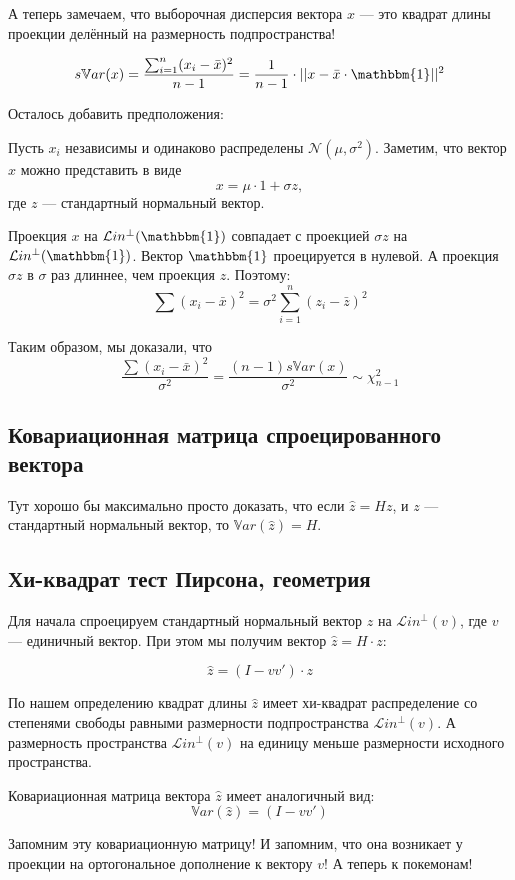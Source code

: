 \documentclass[11pt,russian,]{article}
\newcommand{\cN}{\mathcal{N}}
\newcommand{\1}{\mathbbm{1}}
\newcommand{\Lin}{\mathcal{L}in}
\newcommand{\Linp}{\Lin^{\perp}}
\newcommand{\sVar}{s\mathbb{V}ar}
\newcommand{\Var}{\mathbb{V}ar}
\begin{document}
А теперь замечаем, что выборочная дисперсия вектора \(x\) --- это
квадрат длины проекции делённый на размерность подпространства!

\[
\sVar(x) = \frac{\sum_{i=1}^n (x_i - \bar x)^2}{n-1} = \frac{1}{n-1}\cdot ||x - \bar x \cdot \1||^2
\]

Осталось добавить предположения:

Пусть \(x_i\) независимы и одинаково распределены
\(\cN(\mu, \sigma^2)\). Заметим, что вектор \(x\) можно представить в
виде \[
x = \mu \cdot 1 + \sigma z,
\] где \(z\) --- стандартный нормальный вектор.

Проекция \(x\) на \(\Linp(\1)\) совпадает с проекцией \(\sigma z\) на
\(\Linp(\1)\). Вектор \(\1\) проецируется в нулевой. А проекция
\(\sigma z\) в \(\sigma\) раз длиннее, чем проекция \(z\). Поэтому: \[
\sum (x_i - \bar x)^2 = \sigma^2 \sum_{i=1}^n (z_i - \bar z)^2
\]

Таким образом, мы доказали, что \[
\frac{\sum (x_i - \bar x)^2}{\sigma^2} = \frac{(n-1)\sVar(x)}{\sigma^2} \sim \chi^2_{n-1}
\]

\subsection{Ковариационная матрица спроецированного вектора}\label{---}

Тут хорошо бы максимально просто доказать, что если \(\hat z = Hz\), и
\(z\) --- стандартный нормальный вектор, то \(\Var(\hat z) = H\).

\subsection{Хи-квадрат тест Пирсона, геометрия}\label{----}

Для начала спроецируем стандартный нормальный вектор \(z\) на
\(\Linp(v)\), где \(v\) --- единичный вектор. При этом мы получим вектор
\(\hat z = H \cdot z\):

\[
\hat z = (I - vv')\cdot z
\]

По нашем определению квадрат длины \(\hat z\) имеет хи-квадрат
распределение со степенями свободы равными размерности подпространства
\(\Linp(v)\). А размерность пространства \(\Linp(v)\) на единицу меньше
размерности исходного пространства.

Ковариационная матрица вектора \(\hat z\) имеет аналогичный вид: \[
\Var(\hat z) = (I - vv')
\]

Запомним эту ковариационную матрицу! И запомним, что она возникает у
проекции на ортогональное дополнение к вектору \(v\)! А теперь к
покемонам!
\end{document}
